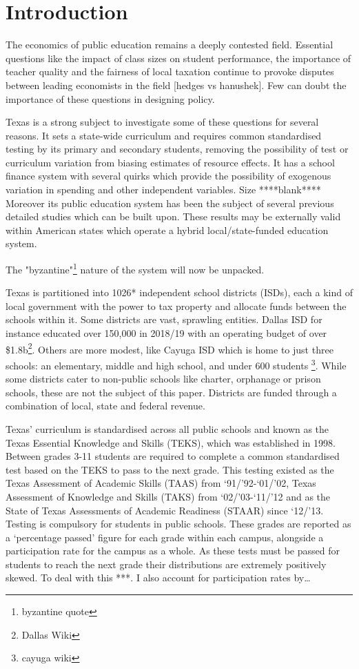 \documentclass[11pt]{article}
\begin{document}
\setlength{\baselineskip}{0.3in} 

\tableofcontents
\clearpage

\section{Introduction}
\label{s:intro}

The economics of public education remains a deeply contested field. Essential questions like the impact of class sizes on student performance, the importance of teacher quality and the fairness of local taxation continue to provoke disputes between leading economists in the field [hedges vs hanushek]. Few can doubt the importance of these questions in designing policy. 

Texas is a strong subject to investigate some of these questions for several reasons. It sets a state-wide curriculum and requires common standardised testing by its primary and secondary students, removing the possibility of test or curriculum variation from biasing estimates of resource effects. It has a school finance system with several quirks which provide the possibility of exogenous variation in spending and other independent variables. Size ****blank****  Moreover its public education system has been the subject of several previous detailed studies which can be built upon. These results may be externally valid within American states which operate a hybrid local/state-funded education system. 

The "byzantine"\footnote{byzantine quote} nature of the system will now be unpacked. 

Texas is partitioned into 1026* independent school districts (ISDs), each a kind of local government with the power to tax property and allocate funds between the schools within it. Some districts are vast, sprawling entities. Dallas ISD for instance educated over 150,000 in 2018/19 with an operating budget of over \$1.8b\footnote{Dallas Wiki}. Others are more modest, like Cayuga ISD which is home to just three schools: an elementary, middle and high school, and under 600 students \footnote{cayuga wiki}. While some districts cater to non-public schools like charter, orphanage or prison schools, these are not the subject of this paper. Districts are funded through a combination of local, state and federal revenue. 

Texas’ curriculum is standardised across all public schools and known as the Texas Essential Knowledge and Skills (TEKS), which was established in 1998. Between grades 3-11 students are required to complete a common standardised test based on the TEKS to pass to the next grade. This testing existed as the Texas Assessment of Academic Skills (TAAS) from ‘91/’92-‘01/’02, Texas Assessment of Knowledge and Skills (TAKS) from ‘02/’03-‘11/’12 and as the State of Texas Assessments of Academic Readiness (STAAR) since ‘12/’13. Testing is compulsory for students in public schools. These grades are reported as a ‘percentage passed’ figure for each grade within each campus, alongside a participation rate for the campus as a whole. As these tests must be passed for students to reach the next grade their distributions are extremely positively skewed. To deal with this ***. I also account for participation rates by… 
\end{document}
